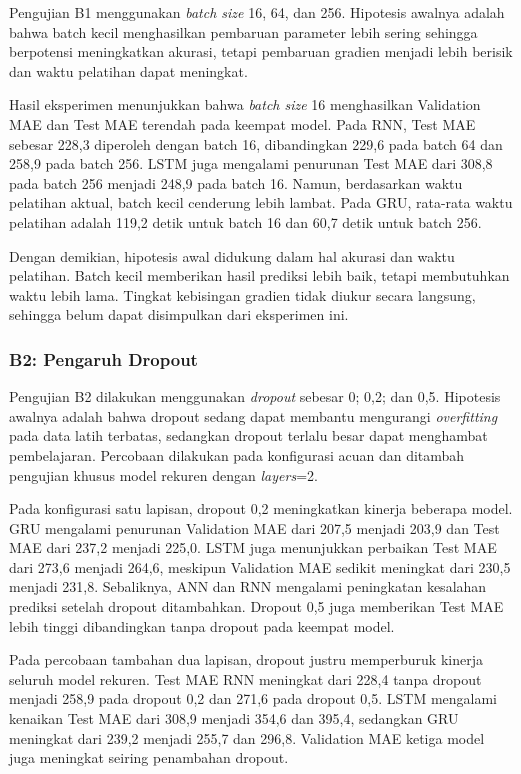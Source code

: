 \documentclass[conference,a4paper]{IEEEtran}
\begin{document}
Pengujian B1 menggunakan \textit{batch size} 16, 64, dan 256. Hipotesis awalnya adalah bahwa batch kecil menghasilkan pembaruan parameter lebih sering sehingga berpotensi meningkatkan akurasi, tetapi pembaruan gradien menjadi lebih berisik dan waktu pelatihan dapat meningkat.

Hasil eksperimen menunjukkan bahwa \textit{batch size} 16 menghasilkan Validation MAE dan Test MAE terendah pada keempat model. Pada RNN, Test MAE sebesar 228,3 diperoleh dengan batch 16, dibandingkan 229,6 pada batch 64 dan 258,9 pada batch 256. LSTM juga mengalami penurunan Test MAE dari 308,8 pada batch 256 menjadi 248,9 pada batch 16. Namun, berdasarkan waktu pelatihan aktual, batch kecil cenderung lebih lambat. Pada GRU, rata-rata waktu pelatihan adalah 119,2 detik untuk batch 16 dan 60,7 detik untuk batch 256.

Dengan demikian, hipotesis awal didukung dalam hal akurasi dan waktu pelatihan. Batch kecil memberikan hasil prediksi lebih baik, tetapi membutuhkan waktu lebih lama. Tingkat kebisingan gradien tidak diukur secara langsung, sehingga belum dapat disimpulkan dari eksperimen ini.

\subsubsection{B2: Pengaruh Dropout}

Pengujian B2 dilakukan menggunakan \textit{dropout} sebesar 0; 0,2; dan 0,5. Hipotesis awalnya adalah bahwa dropout sedang dapat membantu mengurangi \textit{overfitting} pada data latih terbatas, sedangkan dropout terlalu besar dapat menghambat pembelajaran. Percobaan dilakukan pada konfigurasi acuan dan ditambah pengujian khusus model rekuren dengan \textit{layers}=2.

Pada konfigurasi satu lapisan, dropout 0,2 meningkatkan kinerja beberapa model. GRU mengalami penurunan Validation MAE dari 207,5 menjadi 203,9 dan Test MAE dari 237,2 menjadi 225,0. LSTM juga menunjukkan perbaikan Test MAE dari 273,6 menjadi 264,6, meskipun Validation MAE sedikit meningkat dari 230,5 menjadi 231,8. Sebaliknya, ANN dan RNN mengalami peningkatan kesalahan prediksi setelah dropout ditambahkan. Dropout 0,5 juga memberikan Test MAE lebih tinggi dibandingkan tanpa dropout pada keempat model.

Pada percobaan tambahan dua lapisan, dropout justru memperburuk kinerja seluruh model rekuren. Test MAE RNN meningkat dari 228,4 tanpa dropout menjadi 258,9 pada dropout 0,2 dan 271,6 pada dropout 0,5. LSTM mengalami kenaikan Test MAE dari 308,9 menjadi 354,6 dan 395,4, sedangkan GRU meningkat dari 239,2 menjadi 255,7 dan 296,8. Validation MAE ketiga model juga meningkat seiring penambahan dropout.
\end{document}
